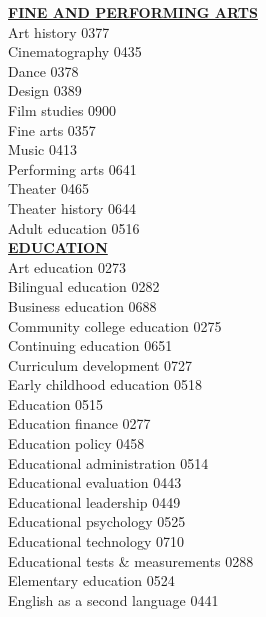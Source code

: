 \documentclass[9pt]{article}
\newcommand{\categoryheading}[1]{{\fontsize{8}{11}\selectfont \textbf{\uline{#1}}}}
\begin{document}
\begin{multicols}{3}
\categoryheading{FINE AND PERFORMING ARTS} \leavevmode \\
Art history \hfill 0377 \leavevmode \\
Cinematography \hfill 0435 \leavevmode \\
Dance \hfill 0378 \leavevmode \\
Design \hfill 0389 \leavevmode \\
Film studies \hfill 0900 \leavevmode \\
Fine arts \hfill 0357 \leavevmode \\
Music \hfill 0413 \leavevmode \\
Performing arts \hfill 0641 \leavevmode \\
Theater \hfill 0465 \leavevmode \\
Theater history \hfill 0644 \leavevmode \\
Adult education \hfill 0516 \leavevmode \\
\columnbreak
\categoryheading{EDUCATION} \leavevmode \\
Art education \hfill 0273 \leavevmode \\
Bilingual education \hfill 0282 \leavevmode \\
Business education \hfill 0688 \leavevmode \\
Community college education \hfill 0275 \leavevmode \\
Continuing education \hfill 0651 \leavevmode \\
Curriculum development \hfill 0727 \leavevmode \\
Early childhood education \hfill 0518 \leavevmode \\
Education \hfill 0515 \leavevmode \\
Education finance \hfill 0277 \leavevmode \\
Education policy \hfill 0458 \leavevmode \\
Educational administration \hfill 0514 \leavevmode \\
Educational evaluation \hfill 0443 \leavevmode \\
Educational leadership \hfill 0449 \leavevmode \\
Educational psychology \hfill 0525 \leavevmode \\
Educational technology \hfill 0710 \leavevmode \\
Educational tests \& measurements \hfill 0288 \leavevmode \\
Elementary education \hfill 0524 \leavevmode \\
English as a second language \hfill 0441 \leavevmode \\

\end{multicols}
\end{document}
